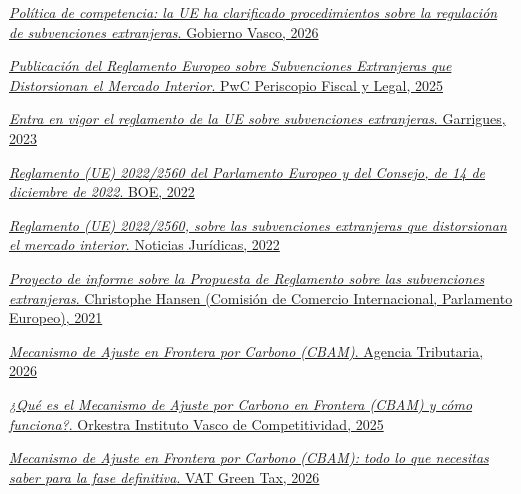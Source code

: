 \documentclass[10pt,a4paper]{article}
\begin{document}
\href{https://www.euskadi.eus/gobierno-vasco/-/nota_prensa/2026/politica-de-competencia-la-ue-ha-clarificado-procedimientos-sobre-la-regulacion-de-subvenciones-extranjeras-que-afecten-a-concursos-publicos-o-concentraciones-monopolisticas-y-ha-validado-diversas-agregaciones-empresariales-en-ultimas-fechas/}{\textit{Política de competencia: la UE ha clarificado procedimientos sobre la regulación de subvenciones extranjeras}. Gobierno Vasco, 2026}

\href{https://periscopiofiscalylegal.pwc.es/publicacion-del-reglamento-europeo-sobre-subvenciones-extranjeras-que-distorsionan-el-mercado-interior/}{\textit{Publicación del Reglamento Europeo sobre Subvenciones Extranjeras que Distorsionan el Mercado Interior}. PwC Periscopio Fiscal y Legal, 2025}

\href{https://www.garrigues.com/es_ES/noticia/entra-vigor-reglamento-ue-subvenciones-extranjeras}{\textit{Entra en vigor el reglamento de la UE sobre subvenciones extranjeras}. Garrigues, 2023}

\href{https://www.boe.es/buscar/doc.php?id=DOUE-L-2022-81950}{\textit{Reglamento (UE) 2022/2560 del Parlamento Europeo y del Consejo, de 14 de diciembre de 2022}. BOE, 2022}

\href{https://noticias.juridicas.com/base_datos/Privado/744356-regl-2022-2560-ue-de-14-dic-subvenciones-extranjeras-que-distorsionan-el.html}{\textit{Reglamento (UE) 2022/2560, sobre las subvenciones extranjeras que distorsionan el mercado interior}. Noticias Jurídicas, 2022}

\href{https://www.europarl.europa.eu/meetdocs/2014_2019/plmrep/COMMITTEES/INTA/PR/2022/04-25/1245578ES.pdf}{\textit{Proyecto de informe sobre la Propuesta de Reglamento sobre las subvenciones extranjeras}. Christophe Hansen (Comisión de Comercio Internacional, Parlamento Europeo), 2021}

\href{https://sede.agenciatributaria.gob.es/Sede/aduanas/prohibiciones-restricciones-operaciones-comercio-exterior-carbono/mecanismo-ajuste-frontera-carbono.html}{\textit{Mecanismo de Ajuste en Frontera por Carbono (CBAM)}. Agencia Tributaria, 2026}

\href{https://www.orkestra.deusto.es/es/actualidad/noticias-eventos/beyondcompetitiveness/2752-mecanismo-de-ajuste-por-carbono-en-frontera-cbam}{\textit{¿Qué es el Mecanismo de Ajuste por Carbono en Frontera (CBAM) y cómo funciona?}. Orkestra Instituto Vasco de Competitividad, 2025}

\href{https://vatgreentax.com/precio-cbam-2026/}{\textit{Mecanismo de Ajuste en Frontera por Carbono (CBAM): todo lo que necesitas saber para la fase definitiva}. VAT Green Tax, 2026}
\end{document}
